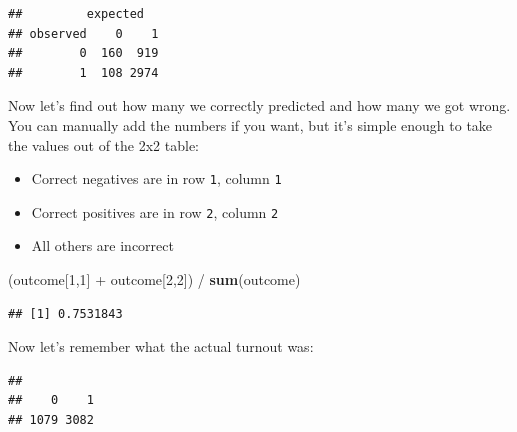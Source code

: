 \documentclass[]{article}
\newenvironment{Shaded}{\begin{snugshade}}{\end{snugshade}}
\newcommand{\KeywordTok}[1]{\textcolor[rgb]{0.13,0.29,0.53}{\textbf{{#1}}}}
\newcommand{\DecValTok}[1]{\textcolor[rgb]{0.00,0.00,0.81}{{#1}}}
\newcommand{\StringTok}[1]{\textcolor[rgb]{0.31,0.60,0.02}{{#1}}}
\newcommand{\NormalTok}[1]{{#1}}
\providecommand{\tightlist}{%
  \setlength{\itemsep}{0pt}\setlength{\parskip}{0pt}}
\theoremstyle{definition}
\theoremstyle{definition}
\theoremstyle{remark}
\begin{document}
\begin{Shaded}
\end{Shaded}

\begin{verbatim}
##         expected
## observed    0    1
##        0  160  919
##        1  108 2974
\end{verbatim}

Now let's find out how many we correctly predicted and how many we got
wrong. You can manually add the numbers if you want, but it's simple
enough to take the values out of the 2x2 table:

\begin{itemize}
\tightlist
\item
  Correct negatives are in row \texttt{1}, column \texttt{1}
\item
  Correct positives are in row \texttt{2}, column \texttt{2}
\item
  All others are incorrect
\end{itemize}

\begin{Shaded}
\begin{Highlighting}[]
\NormalTok{(outcome[}\DecValTok{1}\NormalTok{,}\DecValTok{1}\NormalTok{] +}\StringTok{ }\NormalTok{outcome[}\DecValTok{2}\NormalTok{,}\DecValTok{2}\NormalTok{]) /}\StringTok{ }\KeywordTok{sum}\NormalTok{(outcome)}
\end{Highlighting}
\end{Shaded}

\begin{verbatim}
## [1] 0.7531843
\end{verbatim}

Now let's remember what the actual turnout was:

\begin{Shaded}
\end{Shaded}

\begin{verbatim}
## 
##    0    1 
## 1079 3082
\end{verbatim}
\end{document}
